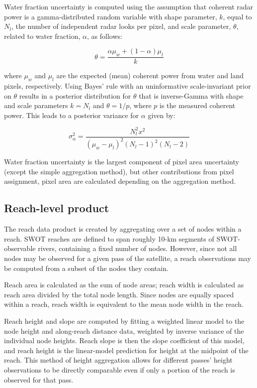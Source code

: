 \documentclass[]{book}
\begin{document}
Water fraction uncertainty is computed using the assumption that coherent radar power is a gamma-distributed random variable with shape parameter, \(k\), equal to \(N_l\), the number of independent radar looks per pixel, and scale parameter, \(\theta\), related to water fraction, \(\alpha\), as follows:

\[
\theta = \frac{\alpha \mu_w + (1 - \alpha) \mu_l}{k}
\]

where \(\mu_w\) and \(\mu_l\) are the expected (mean) coherent power from water and land pixels, respectively. Using Bayes' rule with an uninformative scale-invariant prior on \(\theta\) results in a posterior distribution for \(\theta\) that is inverse-Gamma with shape and scale parameters \(k = N_l\) and \(\theta = 1 / p\), where \(p\) is the measured coherent power. This leads to a posterior variance for \(\alpha\) given by:

\[
\sigma^2_{\alpha} = \frac{N_l^2 x^2}{(\mu_w - \mu_l)^2(N_l - 1)^2(N_l - 2)}
\]

Water fraction uncertainty is the largest component of pixel area uncertainty (except the simple aggregation method), but other contributions from pixel assignment, pixel area are calculated depending on the aggregation method.

\hypertarget{reach-level-product}{%
\subsection{Reach-level product}\label{reach-level-product}}

The reach data product is created by aggregating over a set of nodes within a reach. SWOT reaches are defined to span roughly 10-km segments of SWOT-observable rivers, containing a fixed number of nodes. However, since not all nodes may be observed for a given pass of the satellite, a reach observations may be computed from a subset of the nodes they contain.

Reach area is calculated as the sum of node areas; reach width is calculated as reach area divided by the total node length. Since nodes are equally spaced within a reach, reach width is equivalent to the mean node width in the reach.

Reach height and slope are computed by fitting a weighted linear model to the node height and along-reach distance data, weighted by inverse variance of the individual node heights. Reach slope is then the slope coefficient of this model, and reach height is the linear-model prediction for height at the midpoint of the reach. This method of height aggregation allows for different passes' height observations to be directly comparable even if only a portion of the reach is observed for that pass.
\end{document}
